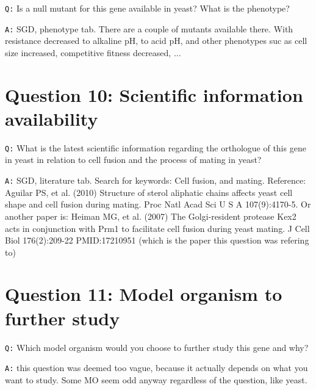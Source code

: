 \documentclass[11pt, a4paper,titlepage]{article}
\begin{document}
\texttt{Q:} Is a null mutant for this gene available in yeast? What is
the phenotype?
\smallskip

\noindent\texttt{A:} SGD, phenotype tab. There are a couple of mutants
available there. With resistance decreased to alkaline pH, to acid pH,
and other phenotypes suc as cell size increased, competitive fitness
decreased, ...

\section*{Question 10: Scientific information availability}

\texttt{Q:} What is the latest scientific information regarding the
orthologue of this gene in yeast in relation to cell fusion and the
process of mating in yeast?
\smallskip

\noindent\texttt{A:} SGD, literature tab. Search for keywords: Cell
fusion, and mating. Reference: Aguilar PS, et al. (2010) Structure of
sterol aliphatic chains affects yeast cell shape and cell fusion
during mating. Proc Natl Acad Sci U S A 107(9):4170-5. Or another
paper is: Heiman MG, et al. (2007) The Golgi-resident protease Kex2
acts in conjunction with Prm1 to facilitate cell fusion during yeast
mating. J Cell Biol 176(2):209-22 PMID:17210951 (which is the paper
this question was refering to)

\section*{Question 11: Model organism to further study}

\texttt{Q:} Which model organism would you choose to further study
this gene and why?
\smallskip

\noindent\texttt{A:} this question was deemed too vague, because it
actually depends on what you want to study. Some MO seem odd anyway
regardless of the question, like yeast.

 
\end{document}
